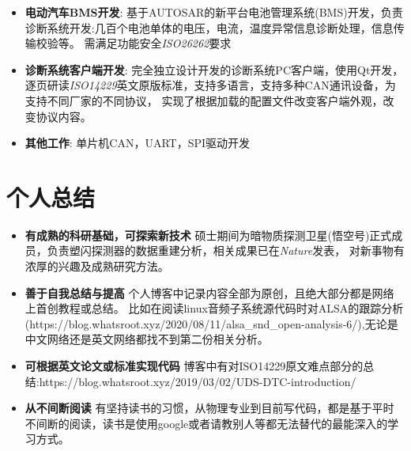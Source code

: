 \documentclass{resume}
\begin{document}
\begin{itemize}[parsep=0.2ex]
    \item \textbf{电动汽车BMS开发}: \newline
    基于AUTOSAR的新平台电池管理系统(BMS)开发，负责诊断系统开发:几百个电池单体的电压，电流，温度异常信息诊断处理，信息传输校验等。
    需满足功能安全\emph{ISO26262}要求
  \item \textbf{诊断系统客户端开发}: \newline
    完全独立设计开发的诊断系统PC客户端，使用Qt开发，逐页研读\emph{ISO14229}英文原版标准，支持多语言，支持多种CAN通讯设备，为支持不同厂家的不同协议，
    实现了根据加载的配置文件改变客户端外观，改变协议内容。
  \item \textbf{其他工作}: \newline
    单片机CAN，UART，SPI驱动开发
\end{itemize}

\section{个人总结}
\begin{itemize}[parsep=0.2ex]
  \item \textbf{有成熟的科研基础，可探索新技术}\newline
    硕士期间为暗物质探测卫星(悟空号)正式成员，负责塑闪探测器的数据重建分析，相关成果已在\emph{Nature}发表，
    对新事物有浓厚的兴趣及成熟研究方法。
  \item \textbf{善于自我总结与提高}\newline
  个人博客中记录内容全部为原创，且绝大部分都是网络上首创教程或总结。
  比如在阅读linux音频子系统源代码时对ALSA的跟踪分析(https://blog.whatsroot.xyz/2020/08/11/alsa\_snd\_open-analysis-6/),无论是中文网络还是英文网络都找不到第二份相关分析。
  \item \textbf{可根据英文论文或标准实现代码}\newline
  博客中有对ISO14229原文难点部分的总结:https://blog.whatsroot.xyz/2019/03/02/UDS-DTC-introduction/
  \item \textbf{从不间断阅读}\newline
  有坚持读书的习惯，从物理专业到目前写代码，都是基于平时不间断的阅读，读书是使用google或者请教别人等都无法替代的最能深入的学习方式。
\end{itemize}
\end{document}
